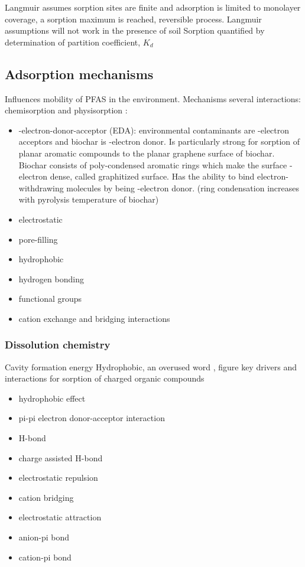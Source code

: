 Langmuir assumes sorption sites are finite and adsorption is limited to monolayer coverage, a sorption maximum is reached, reversible process. Langmuir assumptions will not work in the presence of soil
Sorption quantified by determination of partition coefficient, $K_d$

\citep{Li2019} 

\subsection{Adsorption mechanisms}
Influences mobility of PFAS in the environment. 
Mechanisms
several interactions: chemisorption and physisorption \citep{Li2019}:
\begin{itemize}
    \item \textpi-\textpi electron-donor-acceptor (EDA): environmental contaminants are \textpi-electron acceptors and biochar is \textpi-electron donor. Is particularly strong for sorption of planar aromatic compounds to the planar graphene surface of biochar. Biochar consists of poly-condensed aromatic rings which make the surface \textpi-electron dense, called graphitized surface. Has the ability to bind electron-withdrawing molecules by being \textpi-electron donor. (ring condensation increases with pyrolysis temperature of biochar)
    \item electrostatic
    \item pore-filling
    \item hydrophobic
    \item hydrogen bonding
    \item functional groups
    \item cation exchange and bridging interactions
\end{itemize} 

\subsubsection{Dissolution chemistry}
Cavity formation energy
Hydrophobic, an overused word
\citep{sigmund2022sorption}, figure key drivers and interactions for sorption of charged organic compounds
\begin{itemize}
    \item hydrophobic effect
    \item pi-pi electron donor-acceptor interaction
    \item H-bond
    \item charge assisted H-bond
    \item electrostatic repulsion
    \item cation bridging
    \item electrostatic attraction
    \item anion-pi bond
    \item cation-pi bond
\end{itemize}

